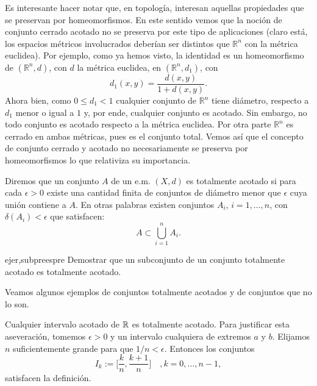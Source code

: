 Es interesante hacer notar que, en topología, interesan aquellas
propiedades que se preservan por homeomorfismos. En este sentido
vemos que la noción de conjunto cerrado acotado no se preserva
por este tipo de aplicaciones (claro está, los espacios métricos
involucrados deberían ser distintos que $\mathbb{R}^n$ con la
métrica euclidea). Por ejemplo, como ya hemos visto, la identidad
es un homeomorfismo de $(\mathbb{R}^n,d)$, con $d$ la métrica
euclidea, en $(\mathbb{R}^n,d_1)$, con
\[
	d_1(x,y)=\frac{d(x,y)}{1+d(x,y)}.
\]
Ahora bien, como $0\leq d_1<1$ cualquier conjunto de
$\mathbb{R}^n$ tiene diámetro, respecto a $d_1$ menor o igual a
$1$ y, por ende, cualquier conjunto es acotado. Sin embargo, no
todo conjunto es acotado respecto a la métrica euclidea. Por otra
parte $\mathbb{R}^n$ es cerrado en ambas métricas, pues es el
conjunto total. Vemos así que el concepto de conjunto cerrado y
acotado no necesariamente se preserva por homeomorfismos lo que
relativiza su importancia.



\begin{definicion}{}  Diremos que un conjunto $A$ de un e.m. $(X,d)$
es totalmente acotado
si para cada $\epsilon>0$ existe una cantidad finita de conjuntos
de diámetro menor que $\epsilon$ cuya unión contiene a  $A$.
En otras palabras existen conjuntos $A_i$, $i=1,...,n$, con
$\delta(A_i)<\epsilon$ que satisfacen:
\[
	A\subset \bigcup\limits_{i=1}^nA_i.
\]
\end{definicion}


\begin{ejercicio}{ejer,subpreespre} Demostrar que un
subconjunto de un conjunto totalmente acotado es totalmente
acotado.
\end{ejercicio}


Veamos algunos ejemplos de conjuntos totalmente acotados y de
conjuntos que no lo son.

\begin{ejemplo}{} Cualquier intervalo acotado de $\mathbb{R}$ es
totalmente acotado. Para justificar esta aseveración, tomemos
$\epsilon>0$ y un intervalo cualquiera de extremos $a$ y $b$.
Elijamos $n$ suficientemente grande para que $1/n<\epsilon$.
Entonces los conjuntos
\[
	I_k:=\Big[\frac{k}{n},\frac{k+1}{n}\Big]\quad ,k=0,\ldots,n-1,
\]
satisfacen la definición.
\end{ejemplo}

